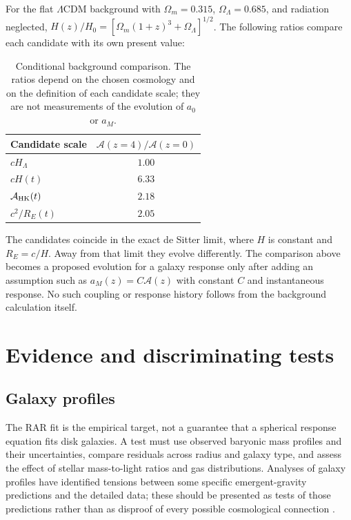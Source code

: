 \documentclass[12pt]{article}
\begin{document}
For the flat $\Lambda$CDM background with $\Omega_m=0.315$, $\Omega_\Lambda=0.685$, and radiation neglected, $H(z)/H_0=[\Omega_m(1+z)^3+\Omega_\Lambda]^{1/2}$. The following ratios compare each candidate with its own present value:
\begin{table}[ht]
  \centering
  \small
  \begin{tabular}{@{}lc@{}}
    \toprule
    Candidate scale & $\mathcal A(z=4)/\mathcal A(z=0)$ \\
    \midrule
    $cH_\Lambda$ & $1.00$ \\
    $cH(t)$ & $6.33$ \\
    $\mathcal A_{\rm HK}(t)$ & $2.18$ \\
    $c^2/R_E(t)$ & $2.05$ \\
    \bottomrule
  \end{tabular}
  \caption{Conditional background comparison. The ratios depend on the chosen cosmology and on the definition of each candidate scale; they are not measurements of the evolution of $a_0$ or $a_M$.}
  \label{tab:horizon-ratios}
\end{table}

The candidates coincide in the exact de Sitter limit, where $H$ is constant and $R_E=c/H$. Away from that limit they evolve differently. The comparison above becomes a proposed evolution for a galaxy response only after adding an assumption such as $a_M(z)=C\mathcal A(z)$ with constant $C$ and instantaneous response. No such coupling or response history follows from the background calculation itself.

\section{Evidence and discriminating tests}
\label{sec:tests}

\subsection{Galaxy profiles}

The RAR fit is the empirical target, not a guarantee that a spherical response equation fits disk galaxies. A test must use observed baryonic mass profiles and their uncertainties, compare residuals across radius and galaxy type, and assess the effect of stellar mass-to-light ratios and gas distributions. Analyses of galaxy profiles have identified tensions between some specific emergent-gravity predictions and the detailed data; these should be presented as tests of those predictions rather than as disproof of every possible cosmological connection \cite{LelliProfiles}.
\end{document}
